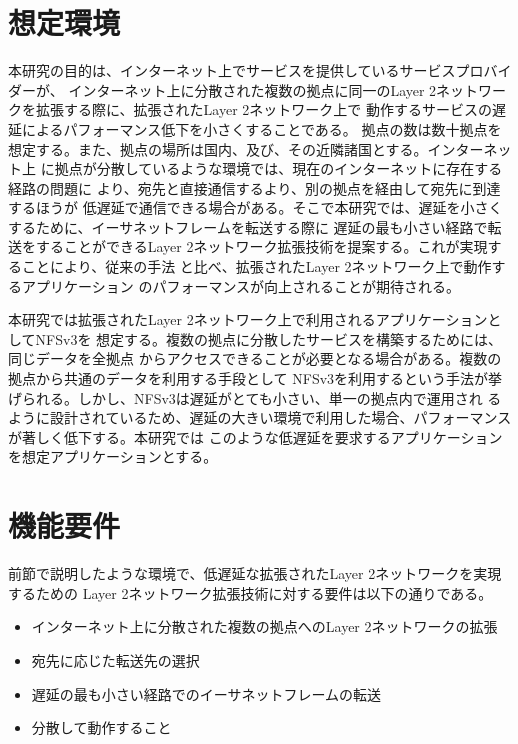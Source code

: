 \section{想定環境}
\label{solv:env}

本研究の目的は、インターネット上でサービスを提供しているサービスプロバイダーが、
インターネット上に分散された複数の拠点に同一のLayer 2ネットワークを拡張する際に、拡張されたLayer 2ネットワーク上で
動作するサービスの遅延によるパフォーマンス低下を小さくすることである。
拠点の数は数十拠点を想定する。また、拠点の場所は国内、及び、その近隣諸国とする。インターネット上
に拠点が分散しているような環境では、現在のインターネットに存在する経路の問題に
より、宛先と直接通信するより、別の拠点を経由して宛先に到達するほうが
低遅延で通信できる場合がある。そこで本研究では、遅延を小さくするために、イーサネットフレームを転送する際に
遅延の最も小さい経路で転送をすることができるLayer 2ネットワーク拡張技術を提案する。これが実現することにより、従来の手法
と比べ、拡張されたLayer 2ネットワーク上で動作するアプリケーション
のパフォーマンスが向上されることが期待される。

本研究では拡張されたLayer 2ネットワーク上で利用されるアプリケーションとしてNFSv3を
想定する。複数の拠点に分散したサービスを構築するためには、同じデータを全拠点
からアクセスできることが必要となる場合がある。複数の拠点から共通のデータを利用する手段として
NFSv3を利用するという手法が挙げられる。しかし、NFSv3は遅延がとても小さい、単一の拠点内で運用され
るように設計されているため、遅延の大きい環境で利用した場合、パフォーマンスが著しく低下する。本研究では
このような低遅延を要求するアプリケーションを想定アプリケーションとする。

\section{機能要件}
\label{solv:requirements}

前節で説明したような環境で、低遅延な拡張されたLayer 2ネットワークを実現するための
Layer 2ネットワーク拡張技術に対する要件は以下の通りである。

\begin{itemize}
	\item{インターネット上に分散された複数の拠点へのLayer 2ネットワークの拡張}
	\item{宛先に応じた転送先の選択}
	\item{遅延の最も小さい経路でのイーサネットフレームの転送}
	\item{分散して動作すること}
\end{itemize}

